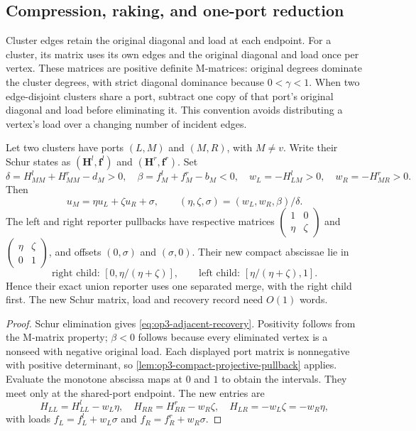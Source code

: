 \subsection{Compression, raking, and one-port reduction}

Cluster edges retain the original diagonal and load at each endpoint.
For a cluster, its matrix uses its own edges and the original diagonal and
load once per vertex. These matrices are positive definite M-matrices:
original degrees dominate the cluster degrees, with strict diagonal dominance
because $0<\gamma<1$. When two edge-disjoint clusters share a port, subtract
one copy of that port's original diagonal and load before eliminating it.
This convention avoids distributing a vertex's load over a changing number
of incident edges.

\begin{lemma}
\label{lem:op3-adjacent-chain-separation}
Let two clusters have ports $(L,M)$ and $(M,R)$, with $M\ne v$.
Write their Schur states as $(\boldsymbol H^l,\boldsymbol f^l)$ and
$(\boldsymbol H^r,\boldsymbol f^r)$. Set
\[
 \delta=H^l_{MM}+H^r_{MM}-d_M>0,\quad
 \beta=f^l_M+f^r_M-b_M<0,\quad
 w_L=-H^l_{LM}>0,\quad w_R=-H^r_{MR}>0.
\]
Then
\begin{equation}
 u_M=\eta u_L+\zeta u_R+\sigma,
 \qquad(\eta,\zeta,\sigma)=(w_L,w_R,\beta)/\delta.
 \label{eq:op3-adjacent-recovery}
\end{equation}
The left and right reporter pullbacks have respective matrices
$\left(\begin{smallmatrix}1&0\\\eta&\zeta\end{smallmatrix}\right)$ and
$\left(\begin{smallmatrix}\eta&\zeta\\0&1\end{smallmatrix}\right)$,
and offsets $(0,\sigma)$ and $(\sigma,0)$. Their new compact abscissae lie in
\[
 \text{right child: }[0,\eta/(\eta+\zeta)],\qquad
 \text{left child: }[\eta/(\eta+\zeta),1].
\]
Hence their exact union reporter uses one separated merge, with the right
child first. The new Schur matrix, load and recovery record need $O(1)$ words.
\end{lemma}
\begin{proof}
Schur elimination gives \eqref{eq:op3-adjacent-recovery}. Positivity follows
from the M-matrix property; $\beta<0$ follows because every eliminated vertex
is a nonseed with negative original load. Each displayed port matrix is
nonnegative with positive determinant, so
\cref{lem:op3-compact-projective-pullback} applies. Evaluate the monotone
abscissa maps at $0$ and $1$ to obtain the intervals. They meet only at the
shared-port endpoint. The new entries are
\[
 H_{LL}=H^l_{LL}-w_L\eta,\quad
 H_{RR}=H^r_{RR}-w_R\zeta,\quad
 H_{LR}=-w_L\zeta=-w_R\eta,
\]
with loads $f_L=f^l_L+w_L\sigma$ and $f_R=f^r_R+w_R\sigma$.
\end{proof}

